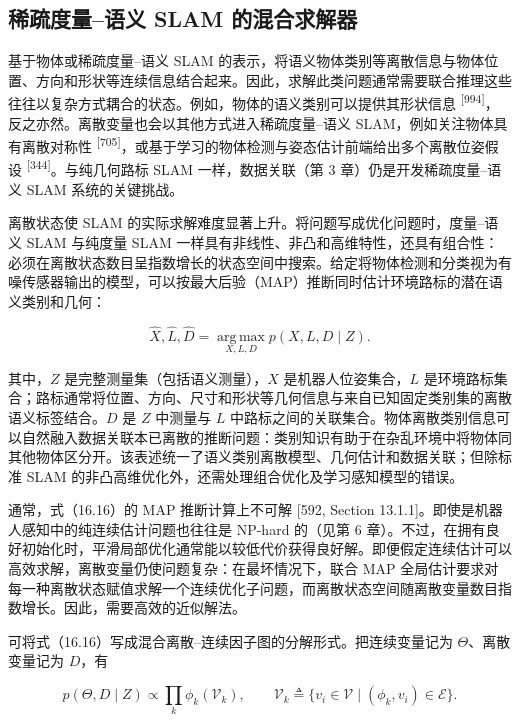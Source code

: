 \subsection{稀疏度量--语义 SLAM 的混合求解器}

基于物体或稀疏度量--语义 SLAM 的表示，将语义物体类别等离散信息与物体位置、方向和形状等连续信息结合起来。因此，求解此类问题通常需要联合推理这些往往以复杂方式耦合的状态。例如，物体的语义类别可以提供其形状信息 \textsuperscript{[994]}，反之亦然。离散变量也会以其他方式进入稀疏度量--语义 SLAM，例如关注物体具有离散对称性 \textsuperscript{[705]}，或基于学习的物体检测与姿态估计前端给出多个离散位姿假设 \textsuperscript{[344]}。与纯几何路标 SLAM 一样，数据关联（第 3 章）仍是开发稀疏度量--语义 SLAM 系统的关键挑战。

离散状态使 SLAM 的实际求解难度显著上升。将问题写成优化问题时，度量--语义 SLAM 与纯度量 SLAM 一样具有非线性、非凸和高维特性，还具有组合性：必须在离散状态数目呈指数增长的状态空间中搜索。给定将物体检测和分类视为有噪传感器输出的模型，可以按最大后验（MAP）推断同时估计环境路标的潜在语义类别和几何：

\begin{equation}
\widehat{X},\widehat{L},\widehat{D}=\operatorname*{arg\,max}_{X,L,D}p(X,L,D\mid Z).\tag{16.16}
\end{equation}

其中，$Z$ 是完整测量集（包括语义测量），$X$ 是机器人位姿集合，$L$ 是环境路标集合；路标通常将位置、方向、尺寸和形状等几何信息与来自已知固定类别集的离散语义标签结合。$D$ 是 $Z$ 中测量与 $L$ 中路标之间的关联集合。物体离散类别信息可以自然融入数据关联本已离散的推断问题：类别知识有助于在杂乱环境中将物体同其他物体区分开。该表述统一了语义类别离散模型、几何估计和数据关联；但除标准 SLAM 的非凸高维优化外，还需处理组合优化及学习感知模型的错误。

通常，式（16.16）的 MAP 推断计算上不可解 [592, Section 13.1.1]。即使是机器人感知中的纯连续估计问题也往往是 NP-hard 的（见第 6 章）。不过，在拥有良好初始化时，平滑局部优化通常能以较低代价获得良好解。即便假定连续估计可以高效求解，离散变量仍使问题复杂：在最坏情况下，联合 MAP 全局估计要求对每一种离散状态赋值求解一个连续优化子问题，而离散状态空间随离散变量数目指数增长。因此，需要高效的近似解法。

可将式（16.16）写成混合离散--连续因子图的分解形式。把连续变量记为 $\Theta$、离散变量记为 $D$，有

\begin{equation}
p(\Theta,D\mid Z)\propto\prod_k\phi_k(\mathcal{V}_k),\qquad
\mathcal{V}_k\triangleq\{v_i\in\mathcal{V}\mid(\phi_k,v_i)\in\mathcal{E}\}.\tag{16.17}
\end{equation}

